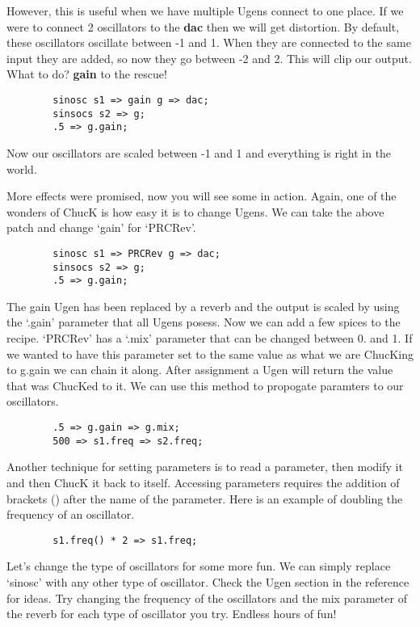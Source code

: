 However, this is useful when we have multiple Ugens connect to one place. If we were to connect 2 oscillators to the {\bf dac} then we will get distortion. By default, these oscillators oscillate between -1 and 1. When they are connected to the same input they are added, so now they go between -2 and 2. This will clip our output. What to do? {\bf gain} to the rescue!

\begin{verbatim}
        sinosc s1 => gain g => dac;
        sinsocs s2 => g;
        .5 => g.gain;
\end{verbatim}

Now our oscillators are scaled between -1 and 1 and everything is right in the world.

More effects were promised, now you will see some in action. Again, one of the wonders of ChucK is how easy it is to change Ugens. We can take the above patch and change `gain' for `PRCRev'.

\begin{verbatim}
        sinosc s1 => PRCRev g => dac;
        sinsocs s2 => g;
        .5 => g.gain;
\end{verbatim}

The gain Ugen has been replaced by a reverb and the output is scaled by using the `.gain' parameter that all Ugens posess. Now we can add a few spices to the recipe. `PRCRev' has a `.mix' parameter that can be changed between 0. and 1. If we wanted to have this parameter set to the same value as what we are ChucKing to g.gain we can chain it along. After assignment a Ugen will return the value that was ChucKed to it. We can use this method to propogate paramters to our oscillators.

\begin{verbatim}
        .5 => g.gain => g.mix;
        500 => s1.freq => s2.freq;
\end{verbatim}

Another  technique for setting parameters is to read a parameter, then modify it and then ChucK it back to itself. Accessing parameters requires the addition of brackets () after the name of the parameter. Here is an example of doubling the frequency of an oscillator. 

\begin{verbatim}
        s1.freq() * 2 => s1.freq;
\end{verbatim}

Let's change the type of oscillators for some more fun. We can simply replace `sinosc' with any other type of oscillator. Check the Ugen section in the reference for ideas. Try changing the frequency of the oscillators and the mix parameter of the reverb for each type of oscillator you try. Endless hours of fun!
